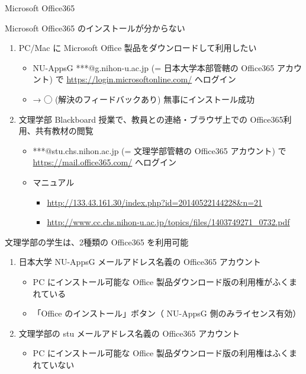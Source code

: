 \documentclass[a4j,10pt]{jsarticle}
\begin{document}
{\newpage\clearpage
{}%
\begin{frame}[label={sec:org6e73ec1},fragile]{Microsoft Office365}
 \begin{block}{Microsoft Office365 のインストールが分からない}
\begin{enumerate}
\item PC/Mac に Microsoft Office 製品をダウンロードして利用したい
\begin{itemize}
\item NU-AppsG ***@g.nihon-u.ac.jp (= 日本大学本部管轄の Office365 アカウント) で \url{https://login.microsoftonline.com/} へログイン
\item → ◯ (解決のフィードバックあり) 無事にインストール成功
\end{itemize}
\par
\item 文理学部 Blackboard 授業で、教員との連絡・ブラウザ上での Office365利用、共有教材の閲覧
\begin{itemize}
\item ***@stu.chs.nihon.ac.jp (= 文理学部管轄の Office365 アカウント) で \url{https://mail.office365.com/} へログイン
\item マニュアル
\begin{itemize}
\item \url{http://133.43.161.30/index.php?id=20140522144228\&n=21}
\item \url{http://www.cc.chs.nihon-u.ac.jp/topics/files/1403749271\_0732.pdf}
\end{itemize}
\end{itemize}
\end{enumerate}
\par
文理学部の学生は、2種類の Office365 を利用可能
\par
\begin{enumerate}
\item 日本大学 NU-AppsG メールアドレス名義の Office365 アカウント
\begin{itemize}
\item PC にインストール可能な Office 製品ダウンロード版の利用権がふくまれている
\item 「Office のインストール」ボタン（ NU-AppsG 側のみライセンス有効）
\end{itemize}
\par
\item 文理学部の stu メールアドレス名義の Office365 アカウント
\begin{itemize}
\item PC にインストール可能な Office 製品ダウンロード版の利用権はふくまれていない

\end{itemize}
\end{enumerate}
\end{block}
\end{frame}}
\end{document}
